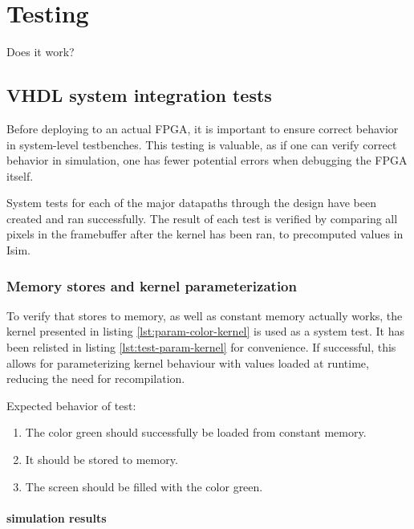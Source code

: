 \documentclass[../main/report.tex]{subfiles}
\begin{document}
\chapter{Testing}

Does it work?

\section{VHDL system integration tests}

Before deploying to an actual FPGA, it is important to ensure correct behavior in system-level testbenches.
This testing is valuable, as if one can verify correct behavior in simulation, one has fewer potential errors when debugging the FPGA itself.

System tests for each of the major datapaths through the design have been created and ran successfully.
The result of each test is verified by comparing all pixels in the framebuffer after the kernel has been ran, to precomputed values in Isim.

\subsection{Memory stores and kernel parameterization}

To verify that stores to memory, as well as constant memory actually works, the kernel presented in listing \ref{lst:param-color-kernel} is used as a system test.
It has been relisted in listing \ref{lst:test-param-kernel} for convenience.
If successful, this allows for parameterizing kernel behaviour with values loaded at runtime, reducing the need for recompilation.


Expected behavior of test:
\begin{enumerate}
  \item
    The color green should successfully be loaded from constant memory.
  \item
    It should be stored to memory.
  \item
    The screen should be filled with the color green.
\end{enumerate}

\subsubsection*{simulation results}
\end{document}
